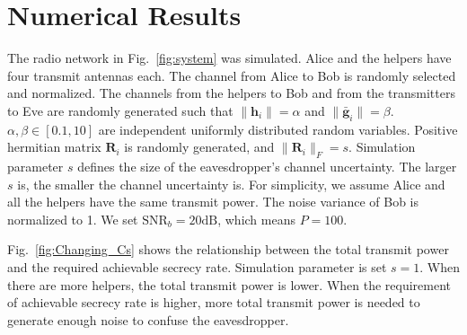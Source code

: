 \documentclass[12pt,journal,draftclsnofoot,onecolumn]{IEEEtran}
\begin{document}
%
%
%



\section{Numerical Results} \label{sec:numerical results}
The radio network in Fig.~\ref{fig:system} was simulated. Alice and the helpers have four transmit antennas each. The channel from Alice to Bob is randomly selected and normalized. The channels from the helpers to Bob and from the transmitters to Eve are randomly generated such that $\|\mathbf{h}_i\| = \alpha$ and $\|\bar{\mathbf{g}}_i\| = \beta$. $\alpha,\beta\in  [0.1,10]$ are independent uniformly distributed random variables.
Positive hermitian matrix $\mathbf{R}_i$ is randomly generated, and $\|\mathbf{R}_i\|_F = s$. Simulation parameter $s$ defines the size of the eavesdropper's channel uncertainty. The larger $s$ is, the smaller the channel uncertainty is. 
For simplicity, we assume Alice and all the helpers have the same transmit power. 
The noise variance of Bob is normalized to 1. We set $\mathrm{SNR}_b = 20 \mathrm{dB}$, which means $P = 100$.




Fig.~\ref{fig:Changing_Cs} shows the relationship between the total transmit power and the required achievable secrecy rate. Simulation parameter is set $s = 1$. When there are more helpers, the total transmit power is lower. 
When the requirement of achievable secrecy rate is higher, more total transmit power is needed to generate enough noise to confuse the eavesdropper. %
\end{document}
